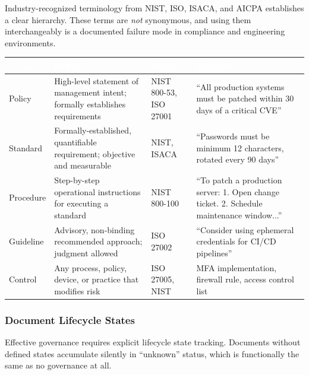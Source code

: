 \documentclass[11pt,letterpaper]{article}
\newcommand{\tableheader}[1]{\textbf{\sffamily\textcolor{white}{#1}}}
\begin{document}
Industry-recognized terminology from NIST, ISO, ISACA, and AICPA establishes a clear hierarchy. These terms are \emph{not} synonymous, and using them interchangeably is a documented failure mode in compliance and engineering environments.

\begin{center}
\begin{tabularx}{\textwidth}{L{2.5cm}L{4cm}L{3cm}X}
\toprule
{}
\tableheader{Term} & \tableheader{Definition} & \tableheader{Origin} & \tableheader{Example} \\
\midrule
Policy & High-level statement of management intent; formally establishes requirements & NIST 800-53, ISO 27001 & ``All production systems must be patched within 30 days of a critical CVE'' \\
Standard & Formally-established, quantifiable requirement; objective and measurable & NIST, ISACA & ``Passwords must be minimum 12 characters, rotated every 90 days'' \\
Procedure & Step-by-step operational instructions for executing a standard & NIST 800-100 & ``To patch a production server: 1. Open change ticket. 2. Schedule maintenance window...'' \\
Guideline & Advisory, non-binding recommended approach; judgment allowed & ISO 27002 & ``Consider using ephemeral credentials for CI/CD pipelines'' \\
Control & Any process, policy, device, or practice that modifies risk & ISO 27005, NIST & MFA implementation, firewall rule, access control list \\
\bottomrule
\end{tabularx}
\end{center}

\subsubsection{Document Lifecycle States}

Effective governance requires explicit lifecycle state tracking. Documents without defined states accumulate silently in ``unknown'' status, which is functionally the same as no governance at all.
\end{document}
